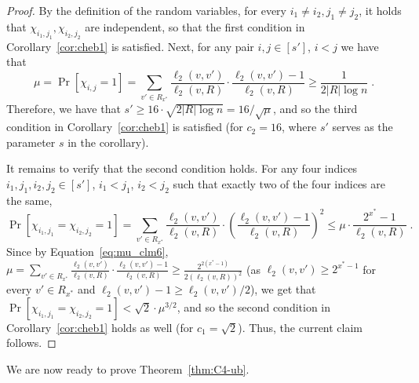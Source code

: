 \begin{proof}
 By the definition of the random variables, for every $i_1\neq i_2, j_1\neq j_2$, it holds that $\chi_{i_1,j_1}, \chi_{i_2, j_2}$ are independent,  so that 
the first condition in Corollary~\ref{cor:cheb1} is satisfied. Next, for any pair $i,j\in [s']$, $i<j$ we have that
\begin{equation} \label{eq:mu_clm6}
\mu = \Pr[\chi_{i,j}=1] = \sum_{v'\in R_{x^*}} \frac{\ell_2(v,v')}{\ell_2(v,R)}\cdot   \frac{\ell_2(v,v')-1}{\ell_2(v,R)} \geq \frac{1}{2|R|\log n}\;.
\end{equation}
Therefore, we have that  $s' \geq 16\cdot\sqrt{2|R|\log n}=16/\sqrt{\mu}$, and so  
the third condition in Corollary~\ref{cor:cheb1}
is satisfied (for $c_2=16$, where $s'$ serves as the parameter $s$ in the corollary).  

It remains to verify that the second condition holds. For any four indices $i_1,j_1,i_2,j_2\in [s']$, $i_1 < j_1$, $i_2 < j_2$ such that exactly two of the four indices are the same,
\begin{equation}
\Pr[\chi_{i_1,j_1}=\chi_{i_2,j_2} = 1] = \sum_{v'\in R_{x^*}} \frac{\ell_2(v,v')}{\ell_2(v,R)}\cdot   \left(\frac{\ell_2(v,v')-1}{\ell_2(v,R)}\right)^2 \leq \mu\cdot \frac{2^{x^*}-1}{\ell_2(v,R)} \;.
\end{equation}
Since by Equation~\eqref{eq:mu_clm6}, $\mu = \sum_{v'\in R_{x^*}} \frac{\ell_2(v,v')}{\ell_2(v,R)}\cdot   \frac{\ell_2(v,v')-1}{\ell_2(v,R)} \geq \frac{2^{2(x^*-1)}}{2(\ell_2(v,R))^2}$ (as $\ell_2(v,v') \geq 2^{x^*-1}$ for every $v'\in R_{x^*}$  and $\ell_2(v,v') - 1 \geq \ell_2(v,v')/2$), 
we get that $\Pr[\chi_{i_1,j_1}=\chi_{i_2,j_2} = 1]<\sqrt 2 \cdot \mu^{3/2}$, and so
the second condition in Corollary~\ref{cor:cheb1} holds as well (for $c_1=\sqrt 2$).
Thus, the current claim follows. 
\end{proof}





\medskip
We are now ready to prove Theorem~\ref{thm:C4-ub}.


